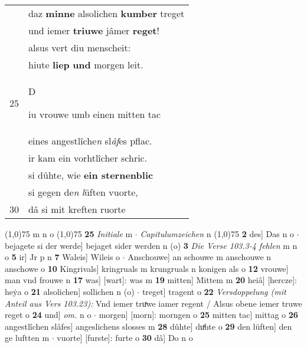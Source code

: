 \documentclass[8pt,a4paper,notitlepage]{article}
\begin{document}
\begin{table}[ht]
\begin{minipage}[t]{0.5\linewidth}
\begin{tabular}{rl}
 & daz \textbf{minne} alsolichen \textbf{kumber} treget\\ 
 & und iemer \textbf{triuwe} jâmer \textbf{reget}!\\ 
 & alsus vert diu menscheit:\\ 
 & hiute \textbf{liep} \textbf{und} morgen leit.\\ 
25 & \begin{large}D\end{large}iu vrouwe umb einen mitten tac\\ 
 & eines angestlîche\textit{n} sl\textit{âf}es pflac.\\ 
 & ir kam ein vorhtlîcher schric.\\ 
 & si dûhte, wie \textbf{ein sternenblic}\\ 
 & si gegen de\textit{n} \textit{l}üften vuorte,\\ 
30 & dâ si mit kreften ruorte\\ 
\end{tabular}
\scriptsize
\line(1,0){75} \newline
m n o \newline
\line(1,0){75} \newline
\textbf{25} \textit{Initiale} m   $\cdot$ \textit{Capitulumzeichen} n  \newline
\line(1,0){75} \newline
\textbf{2} des] Das n o  $\cdot$ bejagete si der werde] bejaget sider werden n (o) \textbf{3} \textit{Die Verse 103.3-4 fehlen} m n o  \textbf{5} ir] Jr p n \textbf{7} Waleis] Wileis o  $\cdot$ Anschouwe] an schouwe m anschouwe n anschowe o \textbf{10} Kingrivals] kringruals m krungruals n konigen als o \textbf{12} vrouwe] man vnd frouwe n \textbf{17} was] [wart]: was m \textbf{19} mitten] Mittem m \textbf{20} heiâ] [hercze]: heẏa o \textbf{21} alsolichen] sollichen n (o)  $\cdot$ treget] tragent o \textbf{22} \textit{Versdoppelung (mit Anteil aus Vers 103.23):} Vnd iemer truͯwe iamer regent / Alsus obene iemer truwe reget o  \textbf{24} und] \textit{om.} n o  $\cdot$ morgen] [morn]: morngen o \textbf{25} mitten tac] mittag o \textbf{26} angestlîchen slâfes] angeslichens slosses m \textbf{28} dûhte] duͯhte o \textbf{29} den lüften] den ge luftten m  $\cdot$ vuorte] [furste]: furte o \textbf{30} dâ] Do n o \newline
\end{minipage}
\end{table}
\newpage
\end{document}
